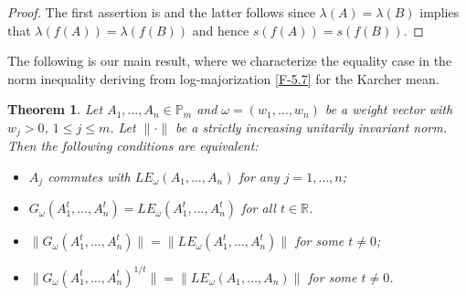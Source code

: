 \documentclass[11pt,reqno]{article}
\newtheorem{theorem}{Theorem}[section]
\numberwithin{equation}{section}
\def\bR{\mathbb{R}}
\def\bP{\mathbb{P}}
\begin{document}
\begin{proof}
The first assertion is \cite[Lemma 2.2]{Hi1} and the latter follows since $\lambda(A)=\lambda(B)$ implies that
$\lambda(f(A))=\lambda(f(B))$ and hence $s(f(A))=s(f(B))$.
\end{proof}

The following is our main result, where we characterize the equality case in the norm inequality deriving from
log-majorization \eqref{F-5.7} for the Karcher mean.

\begin{theorem}\label{T-5.4}
Let $A_1,\dots,A_n\in\bP_m$ and $\omega=(w_1,\dots,w_n)$ be a weight vector with $w_j>0$,
$1\le j\le m$. Let $\|\cdot\|$ be a strictly increasing unitarily invariant norm. Then the following
conditions are equivalent:
\begin{itemize}
\item[\rm(a)] $A_j$ commutes with $LE_\omega(A_1,\dots,A_n)$ for any $j=1,\dots,n$;
\item[\rm(b)] $G_\omega(A_1^t,\dots,A_n^t)=LE_\omega(A_1^t,\dots,A_n^t)$ for all $t\in\bR$.
\item[\rm(c)] $\|G_\omega(A_1^t,\dots,A_n^t)\|=\|LE_\omega(A_1^t,\dots,A_n^t)\|$ for some $t\ne0$;
\item[\rm(d)] $\|G_\omega(A_1^t,\dots,A_n^t)^{1/t}\|=\|LE_\omega(A_1,\dots,A_n)\|$  for some $t\ne0$.
\end{itemize}
\end{theorem}
\end{document}
